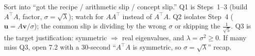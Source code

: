 \documentclass[10pt]{article}
\newcommand{\uu}{\mathbf{u}}
\newcommand{\vv}{\mathbf{v}}
\newcommand{\T}{^{\top}}
\begin{document}
\begin{teachernote}
Sort into ``got the recipe / arithmetic slip / concept slip.'' Q1 is Steps~1--3 (build $A\T A$, factor,
$\sigma=\sqrt\lambda$); watch for $AA\T$ instead of $A\T A$. Q2 isolates Step~4 ($\uu=A\vv/\sigma$); the
common slip is dividing by the wrong $\sigma$ or skipping the $\tfrac1{\sqrt5}$. Q3 is the target
justification: symmetric $\Rightarrow$ real eigenvalues, and $\lambda=\sigma^2\ge0$. If many miss Q3,
open 7.2 with a 30-second ``$A\T A$ is symmetric, so $\sigma=\sqrt\lambda$'' recap.
\end{teachernote}
\end{document}
